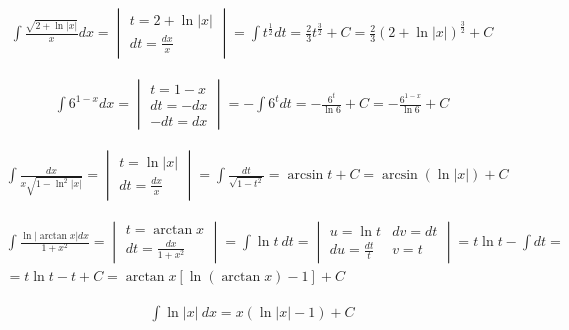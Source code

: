 
\begin{gather*}
  \int \frac{\sqrt{2+\ln|x|}}{x}dx =
  \begin{vmatrix}
    t=2+\ln|x| \\
    dt=\frac{dx}{x}
  \end{vmatrix}
  = \int t^{\frac{1}{2}}dt
  = \frac{2}{3}t^{\frac{3}{2}}+C
  = \frac{2}{3}(2+\ln|x|)^{\frac{3}{2}}+C
\end{gather*}


\begin{gather*}
  \int 6^{1-x}dx =
  \begin{vmatrix}
    t=1-x \\
    dt=-dx \\
    -dt=dx
  \end{vmatrix}
  = -\int 6^tdt
  = -\frac{6^t}{\ln 6} + C
  = -\frac{6^{1-x}}{\ln 6}+C
\end{gather*}


\begin{gather*}
  \int \frac{dx}{x\sqrt{1-\ln^2|x|}} =
  \begin{vmatrix}
    t=\ln|x| \\
    dt=\frac{dx}{x}
  \end{vmatrix}
  = \int \frac{dt}{\sqrt{1-t^2}}
  = \arcsin t + C
  = \arcsin (\ln|x|)+C
\end{gather*}


\begin{gather*}
  \int \frac{\ln|\arctan x|dx}{1+x^2} =
  \begin{vmatrix}
    t=\arctan x \\
    dt = \frac{dx}{1+x^2}
  \end{vmatrix}
  = \int \ln t \ dt
  = \begin{vmatrix}
    u=\ln{t} & dv=dt \\
    du=\frac{dt}{t} & v=t
  \end{vmatrix}
  = t\ln t - \int dt = \\
  = t\ln t - t + C
  = \arctan x [\ln (\arctan x) - 1] +C
\end{gather*}

\begin{gather*}\int \ln |x| \ dx = x(\ln |x|-1)+C \end{gather*}


